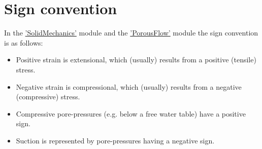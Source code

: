 \section{Sign convention}
\label{chap:sign-convention}


In the
\href{https://mooseframework.inl.gov/modules/solid_mechanics/}{'SolidMechanics'}
module and the
\href{https://mooseframework.inl.gov/modules/porous_flow/}{'PorousFlow'} module
the sign convention is as follows:

\begin{itemize}
      \item Positive strain is extensional, which (usually) results from a positive
            (tensile) stress.
      \item Negative strain is compressional, which (usually) results from a negative
            (compressive) stress.
      \item Compressive pore-pressures (e.g. below a free water table) have a positive
            sign.
      \item Suction is represented by pore-pressures having a negative sign.
\end{itemize}
